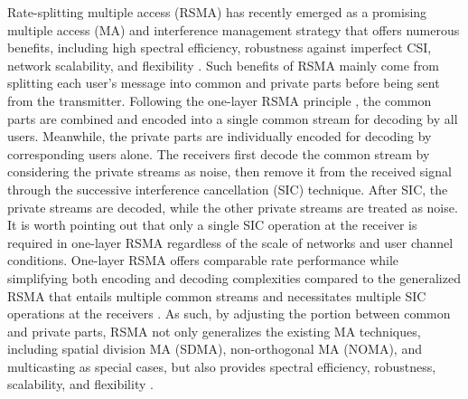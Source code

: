 \documentclass[draftclsnofoot, onecolumn, comsoc, 12pt]{IEEEtran}
\begin{document}
Rate-splitting multiple access (RSMA) has recently emerged as a promising multiple access (MA) and interference management strategy that offers numerous benefits, including high spectral efficiency, robustness against imperfect CSI, network scalability, and flexibility \cite{clerckx2016rate, mao2018energy, mao2018rate, clerckx2019rate, park2023rate}. 
Such benefits of RSMA mainly come from splitting each user's message into common and private parts before being sent from the transmitter. Following the one-layer RSMA principle \cite{mao2018rate}, the common parts are combined and encoded into a single common stream for decoding by all users. Meanwhile, the private parts are individually encoded for decoding by corresponding users alone. The receivers first decode the common stream by considering the private streams as noise, then remove it from the received signal through the successive interference cancellation (SIC) technique. After SIC, the private streams are decoded, while the other private streams are treated as noise. It is worth pointing out that only a single SIC operation at the receiver is required in one-layer RSMA regardless of the scale of networks and user channel conditions.
One-layer RSMA offers comparable rate performance while simplifying both encoding and decoding complexities compared to the generalized RSMA that entails multiple common streams and necessitates multiple SIC operations at the receivers \cite{mao2018rate}. As such, by adjusting the portion between common and private parts, RSMA not only generalizes the existing MA techniques, including spatial division MA (SDMA), non-orthogonal MA (NOMA), and multicasting as special cases, but also provides spectral efficiency, robustness, scalability, and flexibility \cite{park2023rate}.
%
\end{document}
